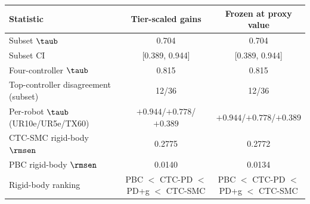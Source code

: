 \begin{tabular}{lcc}
\toprule
Statistic & Tier-scaled gains & Frozen at proxy value \\
\midrule
Subset $\taub$ & 0.704 & 0.704 \\
Subset CI & [0.389, 0.944] & [0.389, 0.944] \\
Four-controller $\taub$ & 0.815 & 0.815 \\
Top-controller disagreement (subset) & 12/36 & 12/36 \\
Per-robot $\taub$ (UR10e/UR5e/TX60) & $+0.944$/$+0.778$/$+0.389$ & $+0.944$/$+0.778$/$+0.389$ \\
\midrule
CTC-SMC rigid-body $\rmsen$ & 0.2775 & 0.2772 \\
PBC rigid-body $\rmsen$ & 0.0140 & 0.0134 \\
Rigid-body ranking & PBC $<$ CTC-PD $<$ PD+g $<$ CTC-SMC & PBC $<$ CTC-PD $<$ PD+g $<$ CTC-SMC \\
\bottomrule
\end{tabular}
